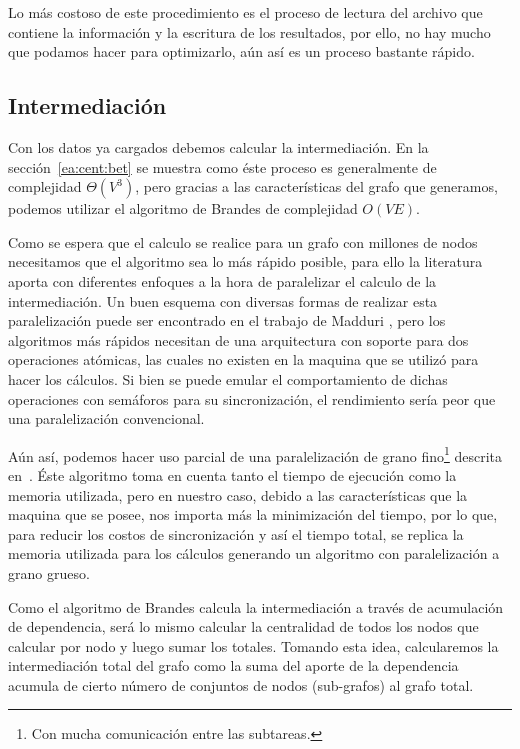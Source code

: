 

Lo más costoso de este procedimiento es el proceso de lectura del archivo que
contiene la información y la escritura de los resultados, por ello,
no hay mucho que podamos hacer para optimizarlo,
aún así es un proceso bastante rápido.

\subsection{Intermediación}
Con los datos ya cargados debemos calcular la intermediación. En la
sección~\ref{ea:cent:bet} se muestra como éste proceso es generalmente de
complejidad $\Theta (V^3)$, pero gracias a las
características del grafo que generamos, podemos utilizar el algoritmo de
Brandes\cite{brandes2001faster} de complejidad $O(VE)$.

Como se espera que el calculo se realice para un grafo con millones de nodos
necesitamos que el algoritmo sea lo más rápido posible, para ello la literatura
aporta con diferentes enfoques a la hora de paralelizar el calculo de la
intermediación. Un buen esquema con diversas formas de realizar esta
paralelización puede ser encontrado en el trabajo de Madduri
\etal\cite{madduri2009faster}, pero los algoritmos más rápidos necesitan de una
arquitectura con soporte para dos operaciones atómicas, las cuales no existen en
la maquina que se utilizó para hacer los cálculos.
Si bien se puede emular el comportamiento de dichas operaciones con semáforos
para su sincronización, el rendimiento sería peor que una paralelización
convencional.

Aún así, podemos hacer uso parcial de una paralelización de grano
fino\footnote{Con mucha comunicación entre las subtareas.} descrita
en~\cite{bader2006parallel}. Éste algoritmo toma en cuenta tanto el tiempo de
ejecución como la memoria utilizada, pero en nuestro caso, debido a las
características que la maquina que se posee, nos importa más la minimización
del tiempo, por lo que, para reducir los costos de sincronización y así el
tiempo total, se replica la memoria utilizada para los cálculos generando un
algoritmo con paralelización a grano grueso.

Como el algoritmo de Brandes calcula la intermediación a través de acumulación
de dependencia, será lo mismo calcular la centralidad de todos los nodos que
calcular por nodo y luego sumar los totales.
Tomando esta idea, calcularemos la intermediación total del grafo como la suma
del aporte de la dependencia acumula de cierto número de conjuntos de nodos
(sub-grafos) al grafo total.

